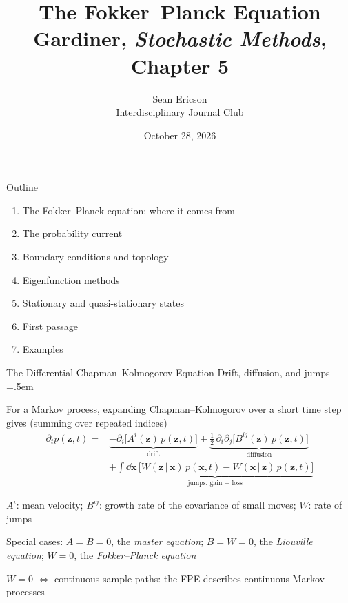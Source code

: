 \documentclass[xcolor={dvipsnames},t]{beamer}
\title[The Fokker--Planck Equation]{The Fokker--Planck Equation \\ {\small Gardiner, \textit{Stochastic Methods}, Chapter 5}}
\author{Sean Ericson \\ {\small Interdisciplinary Journal Club}}
\date{October 28, 2026}
\let\olditemize=\itemize
\let\endolditemize=\enditemize
\renewenvironment{itemize}{\olditemize \itemsep=.5em }{\endolditemize}
\newcommand{\gv}{\,|\,}
\begin{document}
\frame{\titlepage}

\begin{frame}{Outline}
    \begin{enumerate}
        \item The Fokker--Planck equation: where it comes from
        \item The probability current
        \item Boundary conditions and topology
        \item Eigenfunction methods
        \item Stationary and quasi-stationary states
        \item First passage
        \item Examples
    \end{enumerate}
\end{frame}

\begin{frame}{The Differential Chapman--Kolmogorov Equation}
    \alert{Drift, diffusion, and jumps}
    \begin{itemize}
        \item<2-> For a Markov process, expanding Chapman--Kolmogorov over a short time step gives (summing over repeated indices)
        \begin{align*}
            \partial_t p(\bm z,t) = &\underbrace{-\partial_i\bigl[A^i(\bm z)\,p(\bm z,t)\bigr]}_{\text{drift}}
            + \underbrace{\tfrac12\,\partial_i\partial_j\bigl[B^{ij}(\bm z)\,p(\bm z,t)\bigr]}_{\text{diffusion}} \\
            &+ \underbrace{\int\dd\bm x\,\bigl[W(\bm z\gv\bm x)\,p(\bm x,t) - W(\bm x\gv\bm z)\,p(\bm z,t)\bigr]}_{\text{jumps: gain $-$ loss}}
        \end{align*}
        \vspace{-1.5em}
        \item<3-> $A^i$: mean velocity; $B^{ij}$: growth rate of the covariance of small moves; $W$: rate of jumps
        \item<4-> Special cases: $A=B=0$, the \textit{master equation}; $B=W=0$, the \textit{Liouville equation}; $W=0$, the \textit{Fokker--Planck equation}
        \item<5-> $W=0$ $\iff$ continuous sample paths: the FPE describes continuous Markov processes
    \end{itemize}
\end{frame}
\end{document}
